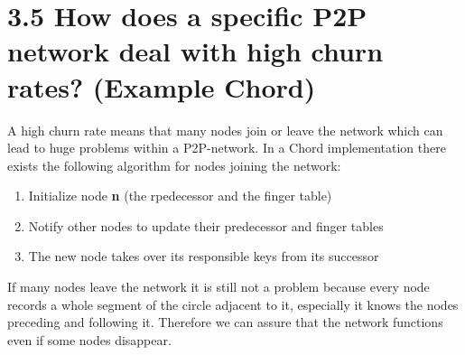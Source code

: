 \documentclass{article}
\begin{document}
	\section*{3.5 How does a specific P2P network deal with high churn rates? (Example Chord)}
	\begin{adjustwidth}{2em}{2em}
		A high churn rate means that many nodes join or leave the network which can lead to huge problems within a P2P-network. In a Chord implementation there exists the following algorithm for nodes joining the network:
		\begin{enumerate}
			\item Initialize node \textbf{n} (the rpedecessor and the finger table)
			\item Notify other nodes to update their predecessor and finger tables
			\item The new node takes over its responsible keys from its successor
		\end{enumerate}
		If many nodes leave the network it is still not a problem because every node records a whole segment of the circle adjacent to it, especially it knows the nodes preceding and following it. Therefore we can assure that the network functions even if some nodes disappear.
	\end{adjustwidth}
\end{document}

